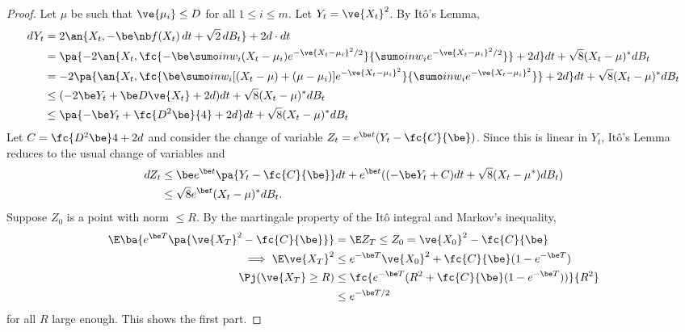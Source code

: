 \begin{proof}
Let $\mu$ be such that $\ve{\mu_i}\le D$ for all $1\le i\le m$. Let $Y_t =\ve{X_t}^2$. By It\^{o}'s Lemma,
\begin{align}
dY_t & = 
2\an{X_t, -\be \nb f(X_t)\,dt + \sqrt 2 \,dB_t} + 2d \cdot dt\\
&=\pa{-2\an{X_t, 
\fc{-\be \sumo in w_i (X_t-\mu_i) e^{-\ve{X_t-\mu_i}^2/2}}{\sumo in w_i e^{-\ve{X_t-\mu_i}^2/2}}} +2 d} dt + \sqrt 8 (X_t-\mu)^*dB_t\\
&= -2\pa{\an{X_t, 
\fc{\be \sumo in w_i [(X_t-\mu)+(\mu-\mu_i)] e^{-\ve{X_t-\mu_i}^2}}{\sumo in w_i e^{-\ve{X_t-\mu_i}^2}}}  +  2d} dt +\sqrt 8 (X_t-\mu)^*dB_t\\
&\le (-2\be Y_t +\be D \ve{X_t}+ 2d)dt + \sqrt 8 (X_t-\mu)^*dB_t\\
&\le \pa{-\be Y_t + \fc{D^2\be}{4}+2d} dt+ \sqrt 8 (X_t-\mu)^*dB_t
\end{align}
Let $C=\fc{D^2\be}4+2d$ and consider the change of variable $Z_t = e^{\be t}(Y_t-\fc{C}{\be})$. Since this is linear in $Y_t$, It\^o's Lemma reduces to the usual change of variables and
\begin{align}
dZ_t &\le \be e^{\be t} \pa{Y_t-\fc{C}{\be}}dt 
+ e^{\be t} ((-\be Y_t + C) dt + \sqrt 8 (X_t-\mu^*)dB_t)\\
&\le \sqrt 8 e^{\be t} (X_t-\mu)^* dB_t.
\end{align}
Suppose $Z_0$ is a point with norm $\le R$. 
By the martingale property of the It\^o integral and Markov's inequality,
\begin{align}
\E\ba{ e^{\be T} \pa{\ve{X_T}^2  -\fc{C}{\be}}}
&= \E Z_T\le Z_0 = \ve{X_0}^2-\fc{C}{\be}\\
\implies
\E \ve{X_T}^2 &\le e^{-\be T} \ve{X_0}^2 + \fc{C}{\be} (1-e^{-\be T})\\
\Pj(\ve{X_T}\ge R) &\le \fc{e^{-\be T}(R^2+\fc{C}{\be}(1-e^{-\be T}))}{R^2}\\
&\le e^{-\be T/2}
\end{align}
for all $R$ large enough.  This shows the first part.


\end{proof}
